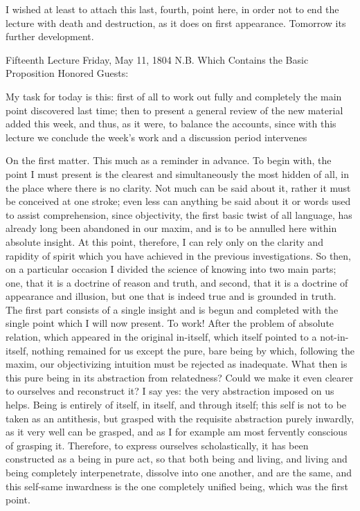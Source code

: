 I wished at least to attach this last, fourth, point here,
in order not to end the lecture with death and destruction,
as it does on first appearance.
Tomorrow its further development.

Fifteenth Lecture
Friday, May 11, 1804
N.B. Which Contains the Basic Proposition
Honored Guests:

My task for today is this:
first of all to work out fully and completely
the main point discovered last time;
then to present a general review of
the new material added this week,
and thus, as it were, to balance the accounts,
since with this lecture we conclude the week’s work
and a discussion period intervenes

On the first matter.
This much as a reminder in advance.
To begin with, the point I must present is
the clearest and simultaneously the most hidden of all,
in the place where there is no clarity.
Not much can be said about it,
rather it must be conceived at one stroke;
even less can anything be said about it
or words used to assist comprehension,
since objectivity, the first basic twist of all language,
has already long been abandoned in our maxim,
and is to be annulled here within absolute insight.
At this point, therefore, I can rely only
on the clarity and rapidity of spirit
which you have achieved in the previous investigations.
So then, on a particular occasion I divided
the science of knowing into two main parts;
one, that it is a doctrine of reason and truth,
and second, that it is a doctrine of appearance and illusion,
but one that is indeed true and is grounded in truth.
The first part consists of a single insight and is begun
and completed with the single point which I will now present.
To work!
After the problem of absolute relation,
which appeared in the original in-itself,
which itself pointed to a not-in-itself,
nothing remained for us except
the pure, bare being by which, following the maxim,
our objectivizing intuition must be rejected as inadequate.
What then is this pure being in its abstraction from relatedness?
Could we make it even clearer to ourselves and reconstruct it?
I say yes: the very abstraction imposed on us helps.
Being is entirely of itself, in itself, and through itself;
this self is not to be taken as an antithesis,
but grasped with the requisite abstraction purely inwardly,
as it very well can be grasped,
and as I for example am most fervently conscious of grasping it.
Therefore, to express ourselves scholastically,
it has been constructed as a being in pure act,
so that both being and living, and living and being
completely interpenetrate, dissolve into one another,
and are the same, and this self-same inwardness is
the one completely unified being,
which was the first point.

